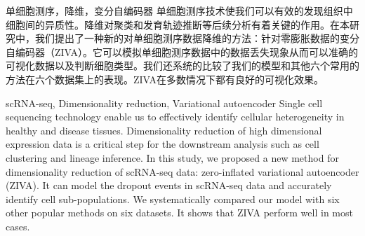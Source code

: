 \begin{中文摘要}{单细胞测序，降维，变分自编码器}
  单细胞测序技术使我们可以有效的发现组织中细胞间的异质性。降维对聚类和发育轨迹推断等后续分析有着关键的作用。在本研究中，我们提出了一种新的对单细胞测序数据降维的方法：针对零膨胀数据的变分自编码器（ZIVA）。它可以模拟单细胞测序数据中的数据丢失现象从而可以准确的可视化数据以及判断细胞类型。我们还系统的比较了我们的模型和其他六个常用的方法在六个数据集上的表现。ZIVA在多数情况下都有良好的可视化效果。
\end{中文摘要}

\begin{英文摘要}{scRNA-seq, Dimensionality reduction, Variational autoencoder}
  Single cell sequencing technology enable us to effectively identify cellular heterogeneity in healthy and disease tissues. Dimensionality reduction of high dimensional expression data is a critical step for the downstream analysis such as cell clustering and lineage inference. In this study, we proposed a new method for dimensionality reduction of scRNA-seq data: zero-inflated variational autoencoder (ZIVA). It can model the dropout events in scRNA-seq data and accurately identify cell sub-populations. We systematically compared our model with six other popular methods on six datasets. It shows that ZIVA perform well in most cases.
\end{英文摘要}
